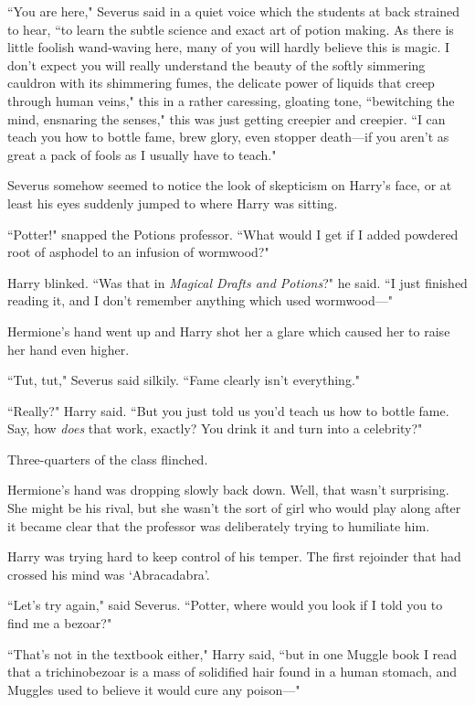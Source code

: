 ``You are here," Severus said in a quiet voice which the students at back strained to hear, ``to learn the subtle science and exact art of potion making. As there is little foolish wand-waving here, many of you will hardly believe this is magic. I don't expect you will really understand the beauty of the softly simmering cauldron with its shimmering fumes, the delicate power of liquids that creep through human veins," this in a rather caressing, gloating tone, ``bewitching the mind, ensnaring the senses," this was just getting creepier and creepier. ``I can teach you how to bottle fame, brew glory, even stopper death—if you aren't as great a pack of fools as I usually have to teach."

Severus somehow seemed to notice the look of skepticism on Harry's face, or at least his eyes suddenly jumped to where Harry was sitting.

``Potter!" snapped the Potions professor. ``What would I get if I added powdered root of asphodel to an infusion of wormwood?"

Harry blinked. ``Was that in \emph{Magical Drafts and Potions}?" he said. ``I just finished reading it, and I don't remember anything which used wormwood—"

Hermione's hand went up and Harry shot her a glare which caused her to raise her hand even higher.

``Tut, tut," Severus said silkily. ``Fame clearly isn't everything."

``Really?" Harry said. ``But you just told us you'd teach us how to bottle fame. Say, how \emph{does} that work, exactly? You drink it and turn into a celebrity?"

Three-quarters of the class flinched.

Hermione's hand was dropping slowly back down. Well, that wasn't surprising. She might be his rival, but she wasn't the sort of girl who would play along after it became clear that the professor was deliberately trying to humiliate him.

Harry was trying hard to keep control of his temper. The first rejoinder that had crossed his mind was `Abracadabra'.

``Let's try again," said Severus. ``Potter, where would you look if I told you to find me a bezoar?"

``That's not in the textbook either," Harry said, ``but in one Muggle book I read that a trichinobezoar is a mass of solidified hair found in a human stomach, and Muggles used to believe it would cure any poison—"

